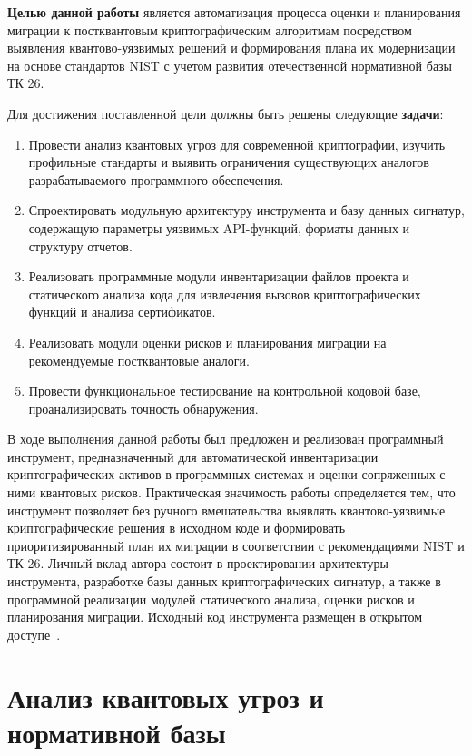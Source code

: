 \documentclass{itmo-vkr}
\begin{document}
	\textbf{Целью данной работы} является автоматизация процесса оценки и планирования миграции к постквантовым криптографическим алгоритмам посредством выявления квантово-уязвимых решений и формирования плана их модернизации на основе стандартов NIST с учетом развития отечественной нормативной базы ТК 26.
	
	Для достижения поставленной цели должны быть решены следующие \textbf{задачи}:
	
	\begin{enumerate}
		\item Провести анализ квантовых угроз для современной криптографии, изучить профильные стандарты и выявить ограничения существующих аналогов разрабатываемого программного обеспечения.
		\item Спроектировать модульную архитектуру инструмента и базу данных сигнатур, содержащую параметры уязвимых API-функций, форматы данных и структуру отчетов.
		\item Реализовать программные модули инвентаризации файлов проекта и статического анализа кода для извлечения вызовов криптографических функций и анализа сертификатов.
		\item Реализовать модули оценки рисков и планирования миграции на рекомендуемые постквантовые аналоги.
		\item Провести функциональное тестирование на контрольной кодовой базе, проанализировать точность обнаружения.
		
	\end{enumerate}
	
	В ходе выполнения данной работы был предложен и реализован программный инструмент, предназначенный для автоматической инвентаризации криптографических активов в программных системах и оценки сопряженных с ними квантовых рисков. Практическая значимость работы определяется тем, что инструмент позволяет без ручного вмешательства выявлять квантово-уязвимые криптографические решения в исходном коде и формировать приоритизированный план их миграции в соответствии с рекомендациями NIST и ТК 26. Личный вклад автора состоит в проектировании архитектуры инструмента, разработке базы данных криптографических сигнатур, а также в программной реализации модулей статического анализа, оценки рисков и планирования миграции. Исходный код инструмента размещен в открытом доступе~\cite{pqc-tool-github}.
	
	
	
	
	\section{Анализ квантовых угроз и нормативной базы}
	
\end{document}
